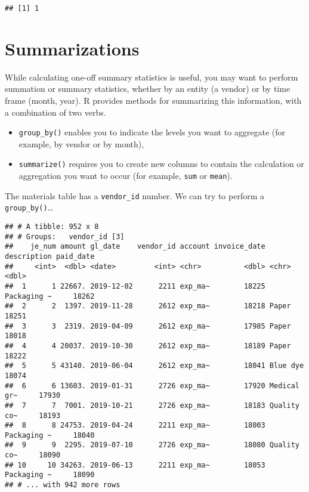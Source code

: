 \documentclass[
]{book}
\newenvironment{Shaded}{\begin{snugshade}}{\end{snugshade}}
\newcommand{\KeywordTok}[1]{\textcolor[rgb]{0.13,0.29,0.53}{\textbf{#1}}}
\newcommand{\NormalTok}[1]{#1}
\newcommand{\OperatorTok}[1]{\textcolor[rgb]{0.81,0.36,0.00}{\textbf{#1}}}
\newcommand{\StringTok}[1]{\textcolor[rgb]{0.31,0.60,0.02}{#1}}
\providecommand{\tightlist}{%
  \setlength{\itemsep}{0pt}\setlength{\parskip}{0pt}}
\begin{document}
\begin{verbatim}
## [1] 1
\end{verbatim}

\hypertarget{summarizations}{%
\section{Summarizations}\label{summarizations}}

While calculating one-off summary statistics is useful, you may want to perform summation or summary statistics, whether by an entity (a vendor) or by time frame (month, year). R provides methods for summarizing this information, with a combination of two verbs.

\begin{itemize}
\tightlist
\item
  \texttt{group\_by()} enables you to indicate the levels you want to aggregate (for example, by vendor or by month),
\item
  \texttt{summarize()} requires you to create new columns to contain the calculation or aggregation you want to occur (for example, \texttt{sum} or \texttt{mean}).
\end{itemize}

The materials table has a \texttt{vendor\_id} number. We can try to perform a \texttt{group\_by()}\ldots{}

\begin{Shaded}
\end{Shaded}

\begin{verbatim}
## # A tibble: 952 x 8
## # Groups:   vendor_id [3]
##    je_num amount gl_date    vendor_id account invoice_date description paid_date
##     <int>  <dbl> <date>         <int> <chr>          <dbl> <chr>           <dbl>
##  1      1 22667. 2019-12-02      2211 exp_ma~        18225 Packaging ~     18262
##  2      2  1397. 2019-11-28      2612 exp_ma~        18218 Paper           18251
##  3      3  2319. 2019-04-09      2612 exp_ma~        17985 Paper           18018
##  4      4 20037. 2019-10-30      2612 exp_ma~        18189 Paper           18222
##  5      5 43140. 2019-06-04      2612 exp_ma~        18041 Blue dye        18074
##  6      6 13603. 2019-01-31      2726 exp_ma~        17920 Medical gr~     17930
##  7      7  7001. 2019-10-21      2726 exp_ma~        18183 Quality co~     18193
##  8      8 24753. 2019-04-24      2211 exp_ma~        18003 Packaging ~     18040
##  9      9  2295. 2019-07-10      2726 exp_ma~        18080 Quality co~     18090
## 10     10 34263. 2019-06-13      2211 exp_ma~        18053 Packaging ~     18090
## # ... with 942 more rows
\end{verbatim}
\end{document}
